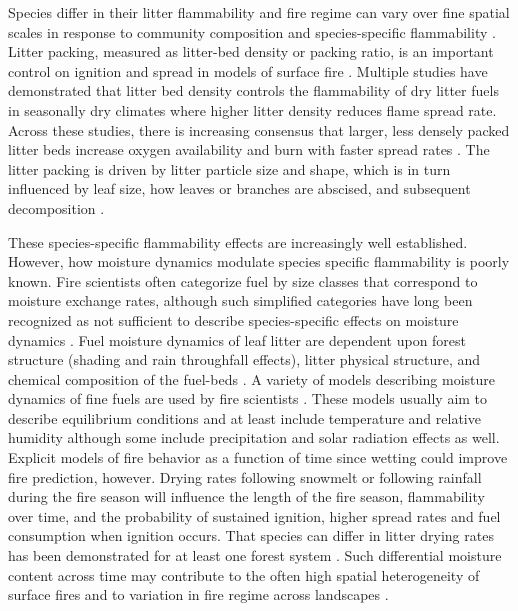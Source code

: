 \documentclass[letterpaper,12pt]{article}
\begin{document}
Species differ in their litter flammability \citep{Fonda+Belanger+etal-1998,
  Fonda-2001, Scarff+Westoby-2006, Kane+Varner+etal-2008,
  Cornwell+Elvira+etal-2015} and fire regime can vary over fine spatial scales
in response to community composition and species-specific flammability
\citep{Stephens-2001, Hille+Stephens-2005, Schwilk+Caprio-2011}. Litter
packing, measured as litter-bed density or packing ratio, is an important
control on ignition and spread in models of surface fire \citep{Weber-1991,
  Balbi+Santoni+etal-1999, Morvan+Larini-2001}. Multiple studies have
demonstrated that litter bed density controls the flammability of dry litter
fuels in seasonally dry climates where higher litter density reduces flame
spread rate. Across these studies, there is increasing consensus that larger,
less densely packed litter beds increase oxygen availability and burn with
faster spread rates \citep{Scarff+Westoby-2006, Schwilk+Caprio-2011,
  Magalhaes+Schwilk-2012, Cornwell+Elvira+etal-2015, Varner+Kane+etal-2015,
  Kreye+Varner+etal-2018}. The litter packing is driven by litter particle size
and shape, which is in turn influenced by leaf size, how leaves or branches are
abscised, and subsequent decomposition \citep{Fonda+Belanger+etal-1998,
  Stephens+Finney+etal-2004, Scarff+Westoby-2006, Kane+Varner+etal-2008,
  Cornwell+Elvira+etal-2015, Zhao+Cornwell+etal-2016,
  Grootemaat+Wright+etal-2017, Prior+Murphy+etal-2018,
  Zhao+vanLogtestijn+etal-2019}.

These species-specific flammability effects are increasingly well established.
However, how moisture dynamics modulate species specific flammability is poorly
known. Fire scientists often categorize fuel by size classes that correspond to
moisture exchange rates, although such simplified categories have long been
recognized as not sufficient to describe species-specific effects on moisture
dynamics \citep{Anderson-1985}. Fuel moisture dynamics of leaf litter are
dependent upon forest structure (shading and rain throughfall effects), litter
physical structure, and chemical composition of the fuel-beds
\citep{Nelson+Hiers-2008, Matthews-2014, Kreye_Hiers_etal-2018}. A variety of
models describing moisture dynamics of fine fuels are used by fire scientists
\citep{Viney-1991, Nelson-2000, Catchpole+Catchpole+etal-2001}. These models
usually aim to describe equilibrium conditions and at least include temperature
and relative humidity although some include precipitation and solar radiation
effects as well. Explicit models of fire behavior as a function of time since
wetting could improve fire prediction, however. Drying rates following snowmelt
or following rainfall during the fire season will influence the length of the
fire season, flammability over time, and the probability of sustained ignition,
higher spread rates and fuel consumption when ignition occurs. That species can
differ in litter drying rates has been demonstrated for at least one forest
system \citep{Kreye+Varner+etal-2013}. Such differential moisture content
across time may contribute to the often high spatial heterogeneity of surface
fires \citep{Hille+Stephens-2005, Knapp+Keeley-2006, Kreye_Hiers_etal-2018} and
to variation in fire regime across landscapes \citep{Stephens-2001}.
\end{document}
